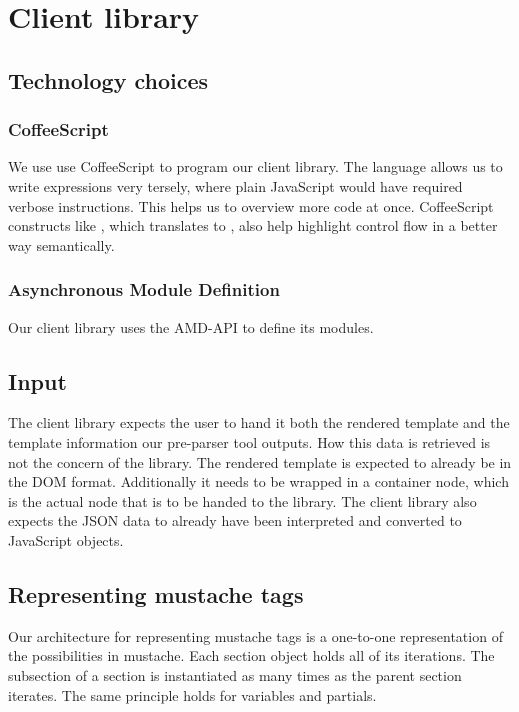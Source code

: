 
\section{Client library}

\subsection{Technology choices}

\subsubsection{CoffeeScript}
We use use CoffeeScript to program our client library. The language allows us to 
write expressions very tersely, where plain JavaScript would have required
verbose instructions. This helps us to overview more code at once.
CoffeeScript constructs like , which translates to
, also help highlight control flow in a better way
semantically.

\subsubsection{Asynchronous Module Definition}
Our client library uses the AMD-API to define its modules.

\subsection{Input}
The client library expects the user to hand it both the rendered template and
the template information our pre-parser tool outputs.
How this data is retrieved is not the concern of the library.
The rendered template is expected to already be in the DOM format.
Additionally it needs to be wrapped in a container node,
which is the actual node that is to be handed to the library.
The client library also expects the JSON data to already have been interpreted
and converted to JavaScript objects.

\subsection{Representing mustache tags}
Our architecture for representing mustache tags is a one-to-one representation
of the possibilities in mustache.
Each section object holds all of its iterations. The subsection of a section is
instantiated as many times as the parent section iterates. The same principle
holds for variables and partials.

